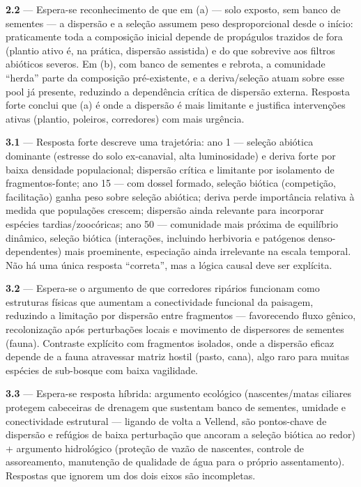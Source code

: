 \documentclass[
  brazilian,
  letterpaper,
  DIV=11,
  numbers=noendperiod]{scrartcl}
\begin{document}
\begin{tcolorbox}
\textbf{2.2} --- Espera-se reconhecimento de que em (a) --- solo
exposto, sem banco de sementes --- a dispersão e a seleção assumem peso
desproporcional desde o início: praticamente toda a composição inicial
depende de propágulos trazidos de fora (plantio ativo é, na prática,
dispersão assistida) e do que sobrevive aos filtros abióticos severos.
Em (b), com banco de sementes e rebrota, a comunidade ``herda'' parte da
composição pré-existente, e a deriva/seleção atuam sobre esse pool já
presente, reduzindo a dependência crítica de dispersão externa. Resposta
forte conclui que (a) é onde a dispersão é mais limitante e justifica
intervenções ativas (plantio, poleiros, corredores) com mais urgência.

\textbf{3.1} --- Resposta forte descreve uma trajetória: ano 1 ---
seleção abiótica dominante (estresse do solo ex-canavial, alta
luminosidade) e deriva forte por baixa densidade populacional; dispersão
crítica e limitante por isolamento de fragmentos-fonte; ano 15 --- com
dossel formado, seleção biótica (competição, facilitação) ganha peso
sobre seleção abiótica; deriva perde importância relativa à medida que
populações crescem; dispersão ainda relevante para incorporar espécies
tardias/zoocóricas; ano 50 --- comunidade mais próxima de equilíbrio
dinâmico, seleção biótica (interações, incluindo herbivoria e patógenos
denso-dependentes) mais proeminente, especiação ainda irrelevante na
escala temporal. Não há uma única resposta ``correta'', mas a lógica
causal deve ser explícita.

\textbf{3.2} --- Espera-se o argumento de que corredores ripários
funcionam como estruturas físicas que aumentam a conectividade funcional
da paisagem, reduzindo a limitação por dispersão entre fragmentos ---
favorecendo fluxo gênico, recolonização após perturbações locais e
movimento de dispersores de sementes (fauna). Contraste explícito com
fragmentos isolados, onde a dispersão eficaz depende de a fauna
atravessar matriz hostil (pasto, cana), algo raro para muitas espécies
de sub-bosque com baixa vagilidade.

\textbf{3.3} --- Espera-se resposta híbrida: argumento ecológico
(nascentes/matas ciliares protegem cabeceiras de drenagem que sustentam
banco de sementes, umidade e conectividade estrutural --- ligando de
volta a Vellend, são pontos-chave de dispersão e refúgios de baixa
perturbação que ancoram a seleção biótica ao redor) + argumento
hidrológico (proteção de vazão de nascentes, controle de assoreamento,
manutenção de qualidade de água para o próprio assentamento). Respostas
que ignorem um dos dois eixos são incompletas.

\end{tcolorbox}
\end{document}
